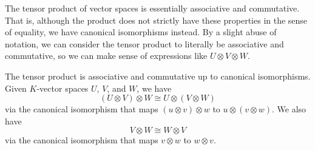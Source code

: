 \documentclass[a4paper,12pt]{article}
\begin{document}
The tensor product of vector spaces is essentially associative and commutative.
That is, although the product does not strictly have these properties in the sense of equality, we have canonical isomorphisms instead.
By a slight abuse of notation, we can consider the tensor product to literally be associative and commutative, so we can make sense of expressions like $U \otimes V \otimes W$.
\begin{proposition}\label{prop:tensor_product_associative_commutative}
    The tensor product is associative and commutative up to canonical isomorphisms.
    Given $K$-vector spaces $U$, $V$, and $W$, we have
    \begin{equation}
        (U \otimes V) \otimes W \cong U \otimes (V \otimes W)
    \end{equation}
    via the canonical isomorphism that maps $(u \otimes v) \otimes w$ to $u \otimes (v \otimes w)$.
    We also have
    \begin{equation}
        V \otimes W \cong W \otimes V
    \end{equation}
    via the canonical isomorphism that maps $v \otimes w$ to $w \otimes v$.
\end{proposition}
\end{document}
